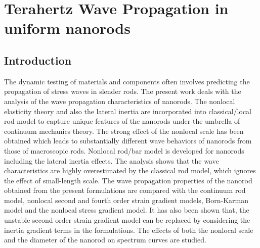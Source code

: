 \section{Terahertz Wave Propagation in uniform nanorods}
\subsection{Introduction}
The dynamic testing of materials and components often involves predicting the propagation of stress waves in slender rods. The present work deals with the analysis of the wave propagation characteristics of nanorods. The nonlocal elasticity theory and also the lateral inertia are incorporated into classical/local rod model to capture unique features of the nanorods under the umbrella of continuum mechanics theory.
The strong effect of the nonlocal scale has been obtained which leads to substantially different wave behaviors of nanorods from those of macroscopic rods. Nonlocal rod/bar model is developed for nanorods including the lateral inertia effects. The analysis shows that the wave characteristics are highly overestimated by the classical rod model, which ignores the effect of small-length scale. The wave propagation properties of the nanorod obtained from the present formulations are compared with the continuum rod model, nonlocal second and fourth order strain gradient models, Born-Karman model and the nonlocal
stress gradient model. It has also been shown that, the unstable second order strain gradient model can be replaced by considering the inertia gradient terms in the formulations. The effects of both the nonlocal scale and the diameter of the nanorod on spectrum curves are studied.

